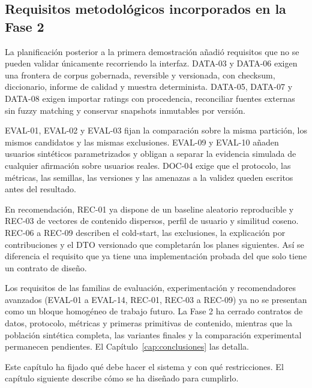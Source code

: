 \subsection{Requisitos metodológicos incorporados en la Fase 2}

La planificación posterior a la primera demostración añadió requisitos que no se pueden
validar únicamente recorriendo la interfaz. DATA-03 y DATA-06 exigen una frontera de corpus
gobernada, reversible y versionada, con checksum, diccionario, informe de calidad y muestra
determinista. DATA-05, DATA-07 y DATA-08 exigen importar ratings con procedencia, reconciliar
fuentes externas sin fuzzy matching y conservar snapshots inmutables por versión.

EVAL-01, EVAL-02 y EVAL-03 fijan la comparación sobre la misma partición, los mismos
candidatos y las mismas exclusiones. EVAL-09 y EVAL-10 añaden usuarios sintéticos
parametrizados y obligan a separar la evidencia simulada de cualquier afirmación sobre
usuarios reales. DOC-04 exige que el protocolo, las métricas, las semillas, las versiones y
las amenazas a la validez queden escritos antes del resultado.

En recomendación, REC-01 ya dispone de un baseline aleatorio reproducible y REC-03 de
vectores de contenido dispersos, perfil de usuario y similitud coseno. REC-06 a REC-09
describen el cold-start, las exclusiones, la explicación por contribuciones y el DTO
versionado que completarán los planes siguientes. Así se diferencia el requisito que ya
tiene una implementación probada del que solo tiene un contrato de diseño.

Los requisitos de las familias de evaluación, experimentación y recomendadores avanzados
(EVAL-01 a EVAL-14, REC-01, REC-03 a REC-09) ya no se presentan como un bloque homogéneo de
trabajo futuro. La Fase 2 ha cerrado contratos de datos, protocolo, métricas y primeras
primitivas de contenido, mientras que la población sintética completa, las variantes finales
y la comparación experimental permanecen pendientes. El
Capítulo~\ref{cap:conclusiones} las detalla.

Este capítulo ha fijado qué debe hacer el sistema y con qué restricciones. El capítulo
siguiente describe cómo se ha diseñado para cumplirlo.
